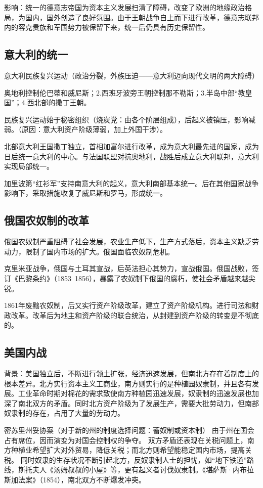 影响：统一的德意志帝国为资本主义发展扫清了障碍，改变了欧洲的地缘政治格局，为国内，国外创造了良好氛围。由于王朝战争自上而下进行改革，德意志联邦内的容克贵族和军国势力被保留下来，统一后仍具有历史保留性。

\subsection{意大利的统一}
意大利民族复兴运动（政治分裂，外族压迫——意大利迈向现代文明的两大障碍）

奥地利控制伦巴蒂和威尼斯；2.西班牙波旁王朝控制那不勒斯；3.半岛中部“教皇国”；4.西北部的撒丁王朝。

民族复兴运动始于秘密组织（烧炭党：由各个阶层组成），后起义被镇压，影响减弱。（原因：意大利资产阶级薄弱，加上外国干涉）。

北部意大利王国撒丁独立，首相加富尔进行改革，成为意大利最先进的国家，成为日后统一意大利的中心。与法国联盟对抗奥地利，战胜后成立意大利联邦，意大利实现局部统一。

加里波第“红衫军”支持南意大利的起义，意大利南部基本统一。后在其他国家战争影响下，采取措施收复了威尼斯和罗马，形成统一。

\subsection{俄国农奴制的改革}
俄国农奴制严重阻碍了社会发展，农业生产低下，生产方式落后，资本主义缺乏劳动力，限制了国内市场的扩大。俄国面临农奴制危机。

克里米亚战争，俄国与土耳其宣战，后英法担心其势力，宣战俄国。俄国战败，签订《巴黎条约》（1853~1856），暴露了农奴制下俄国的腐朽，使社会矛盾越来越尖锐。

1861年废黜农奴制，后又实行资产阶级改革，建立了资产阶级机构。进行司法和财政改革。改革后为地主和资产阶级的联合统治，从封建到资产阶级的转变是不彻底的。

\subsection{美国内战}
背景：美国独立后，不断进行领土扩张，经济迅速发展，但南北方存在着制度上的根本差异。北方实行资本主义工商业，南方则实行的是种植园奴隶制，并且各有发展。工业革命时期对棉花的需求致使南方种植园迅速发展，奴隶制的迅速发展也加深了南北双方的矛盾。同时北方资产阶级为了发展生产，需要大批劳动力，但南部奴隶制的存在，占用了大量的劳动力。

密苏里州妥协案（对于新的州的制度选择问题：蓄奴制或资本制）
由于州在国会占有席位，因而演变为对国会控制权的争夺。
双方矛盾还表现在关税问题上，南方种植业希望扩大对外贸易，降低关税；而北方则希望能稳定国内市场，提高关税。
同时奴隶的生存状况不断引起北方，反奴隶制人士的担忧，如“地下铁道”路线，斯托夫人《汤姆叔叔的小屋》等，更有起义者讨伐奴隶制。《堪萨斯·内布拉斯加法案》（1854），南北双方不断爆发冲突。

